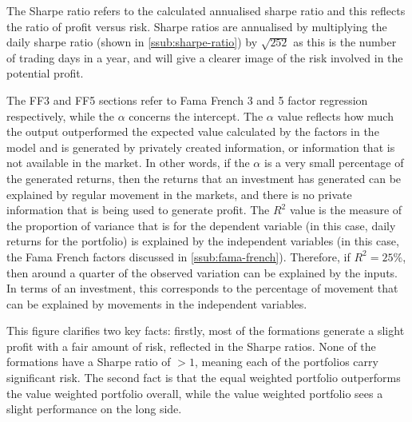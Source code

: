 The Sharpe ratio refers to the calculated annualised sharpe ratio and this reflects the ratio of profit versus risk. Sharpe ratios are annualised by multiplying the daily sharpe ratio (shown in \ref{ssub:sharpe-ratio}) by $\sqrt{252}$ as this is the number of trading days in a year, and will give a clearer image of the risk involved in the potential profit.

The FF3 and FF5 sections refer to Fama French 3 and 5 factor regression respectively, while the $\alpha$ concerns the intercept. The $\alpha$ value reflects how much the output outperformed the expected value calculated by the factors in the model and is generated by privately created information, or information that is not available in the market. In other words, if the $\alpha$ is a very small percentage of the generated returns, then the returns that an investment has generated can be explained by regular movement in the markets, and there is no private information that is being used to generate profit. The $R^2$ value is the measure of the proportion of variance that is for the dependent variable (in this case, daily returns for the portfolio) is explained by the independent variables (in this case, the Fama French factors discussed in \ref{ssub:fama-french}). Therefore, if $R^2 = 25\%$, then around a quarter of the observed variation can be explained by the inputs. In terms of an investment, this corresponds to the percentage of movement that can be explained by movements in the independent variables.

This figure clarifies two key facts: firstly, most of the formations generate a slight profit with a fair amount of risk, reflected in the Sharpe ratios. None of the formations have a Sharpe ratio of $>1$, meaning each of the portfolios carry significant risk. The second fact is that the equal weighted portfolio outperforms the value weighted portfolio overall, while the value weighted portfolio sees a slight performance on the long side.

